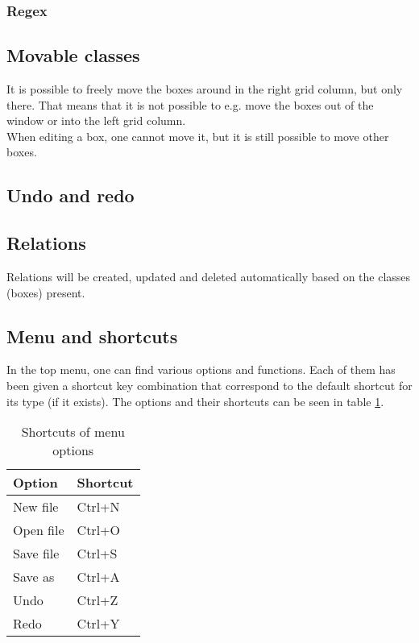 \subsubsection{Regex}

\subsection{Movable classes}

It is possible to freely move the boxes around in the right grid column, but only there. That means that it is not possible to e.g. move the boxes out of the window or into the left grid column.\\
When editing a box, one cannot move it, but it is still possible to move other boxes.

\subsection{Undo and redo}

\subsection{Relations}

Relations will be created, updated and deleted automatically based on the classes (boxes) present.

\subsection{Menu and shortcuts}

In the top menu, one can find various options and functions. Each of them has been given a shortcut key combination that correspond to the default shortcut for its type (if it exists). The options and their shortcuts can be seen in table \ref{tab:menu_shortcut}.

\begin{table}[htbp]
\centering
\begin{tabular}{|l|l|}
\hline
\textbf{Option} & \textbf{Shortcut}\\
\hline
New file & Ctrl+N\\
\hline
Open file & Ctrl+O\\
\hline
Save file & Ctrl+S\\
\hline
Save as & Ctrl+A\\
\hline
Undo & Ctrl+Z\\
\hline
Redo & Ctrl+Y\\
\hline
\end{tabular}
\caption{Shortcuts of menu options}
\label{tab:menu_shortcut}
\end{table}

